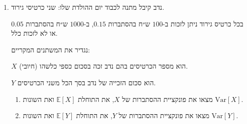 \documentclass[12pt, a4paper]{article}
\newcommand{\PP}{\mathbb{P}}
\newcommand{\Var}{\mathrm{Var}}
\newcommand{\EE}{\mathbb{E}}
\begin{document}
\begin{enumerate}
\noindent\rule{15cm}{0.4pt}

\underline{פתרון:}

\begin{enumerate}
\item
המשתנים תלויים. נשים לב כי
$\PP(X_0=2,X_1=2)=0$
כי זהו מאורע ריק (שבשני מטבעות יצא
$0$
וגם בשני מטבעות יצא
$1$)
 אבל מצד שני
$$.\PP(X_0=2)\cdot\PP(X_1=2)=\frac{1}{4}\cdot\frac{1}{4}\neq0
=\PP(X_0=2,X_1=2)$$

\noindent\rule{15cm}{0.4pt}

\item
המשתנים תלויים. נשים לב כי
$\PP(X_0=0,Y=0)=0$
כי זהו מאורע ריק (שבשני מטבעות יצא
$1$
וגם שזכום המטבעות הוא
$0$)
 אבל מצד שני
$$.\PP(X_0=0)\cdot\PP(Y=0)
=\frac{1}{4}\cdot\frac{1}{4}\neq0
=\PP(X_0=0,Y=0)$$

\noindent\rule{15cm}{0.4pt}

\item
המשתנים תלויים. נשים לב כי
$\PP(X_1=2,Z=1)=0$
כי זהו מאורע ריק (שבשני מטבעות יצא
$1$
וגם בשני מטבעות יצאו תוצאות שונות) אבל מצד שני
$$.\PP(X_1=2)\cdot\PP(Z=1)=\frac{1}{4}\cdot\frac{1}{2}\neq0
=\PP(X_1=2,Z=1)$$

\noindent\rule{15cm}{0.4pt}

\item
המשתנים תלויים. נשים לב כי
$\PP(Y=0,Z=1)=0$
כי זהו מאורע ריק (שבשני מטבעות יצא
$0$
וגם בשני מטבעות יצאו תוצאות שונות) אבל מצד שני
$$.\PP(Y=0)\cdot\PP(Z=1)=\frac{1}{4}\cdot\frac{1}{2}\neq0
=\PP(Y=0,Z=1)$$
\end{enumerate}

\newpage

\item
נדב קיבל מתנה לכבוד יום ההולדת שלו: שני כרטיסי גירוד.

בכל כרטיס גירוד ניתן לזכות ב-$100$
ש״ח בהסתברות
$0.15$,
ב-$1000$
ש״ח בהסתברות
$0.05$
או לא לזכות כלל.

נגדיר את המשתנים המקריים:

$X$
הוא מספר הכרטיסים בהם נדב זכה בסכום כספי כלשהו (חיובי).

$Y$
הוא סכום הזכייה של נדב בסך הכל משני הכרטיסים.

\begin{enumerate}
\item
מצאו את פונקציית ההסתברות של
$X$,
את התוחלת
$\EE[X]$
ואת השונות
$\Var[X]$.
\item
מצאו את פונקציית ההסתברות של
$Y$,
את התוחלת
$\EE[Y]$
ואת השונות
$\Var[Y]$.
\end{enumerate}


\end{enumerate}
\end{document}
